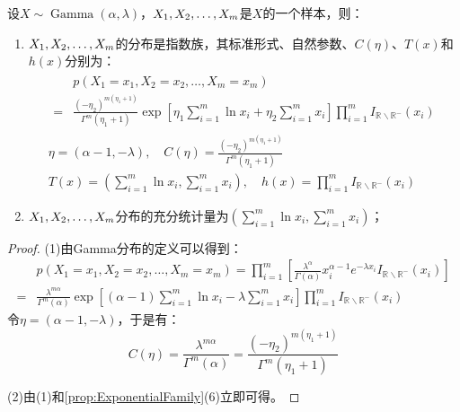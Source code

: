 \begin{theorem}
	设$X\sim\operatorname{Gamma}(\alpha,\lambda)$，$X_1, X_2, \dots, X_{m}$是$X$的一个样本，则：
	\begin{enumerate}
		\item $X_1, X_2, \dots, X_{m}$的分布是指数族，其标准形式、自然参数、$C(\eta)$、$T(x)$和$h(x)$分别为：
		\begin{gather*}
			\begin{aligned}
				&p(X_1=x_1,X_2=x_2,\dots,X_m=x_m) \\
				=&\frac{(-\eta_2)^{m(\eta_1+1)}}{\Gamma^m(\eta_1+1)}\exp\left[\eta_1\sum_{i=1}^{m}\ln x_i+\eta_2\sum_{i=1}^{m}x_i\right]\prod_{i=1}^{m}I_{\mathbb{R}^{}\backslash\mathbb{R}^{-}}(x_i)
			\end{aligned} \\
			\eta=(\alpha-1,-\lambda),\quad C(\eta)=\frac{(-\eta_2)^{m(\eta_1+1)}}{\Gamma^m(\eta_1+1)} \\
			T(x)=\left(\sum_{i=1}^{m}\ln x_i,\sum_{i=1}^{m}x_i\right),\quad h(x)=\prod_{i=1}^{m}I_{\mathbb{R}^{}\backslash\mathbb{R}^{-}}(x_i)
		\end{gather*}
		\item $X_1, X_2, \dots, X_{m}$分布的充分统计量为$\left(\sum\limits_{i=1}^{m}\ln x_i,\sum\limits_{i=1}^{m}x_i\right)$；
	\end{enumerate}
\end{theorem}
\begin{proof}
	(1)由Gamma分布的定义可以得到：
	\begin{align*}
		&p(X_1=x_1,X_2=x_2,\dots,X_m=x_m)=\prod_{i=1}^{m}\left[\frac{\lambda^{\alpha}}{\Gamma(\alpha)}x_i^{\alpha-1}e^{-\lambda x_i}I_{\mathbb{R}^{}\backslash\mathbb{R}^{-}}(x_i)\right] \\
		=&\frac{\lambda^{m\alpha}}{\Gamma^m(\alpha)}\exp\left[(\alpha-1)\sum_{i=1}^{m}\ln x_i-\lambda\sum_{i=1}^{m}x_i\right]\prod_{i=1}^{m}I_{\mathbb{R}^{}\backslash\mathbb{R}^{-}}(x_i)
	\end{align*}
	令$\eta=(\alpha-1,-\lambda)$，于是有：
	\begin{equation*}
		C(\eta)=\frac{\lambda^{m\alpha}}{\Gamma^m(\alpha)}=\frac{(-\eta_2)^{m(\eta_1+1)}}{\Gamma^m(\eta_1+1)}
	\end{equation*}\par
	(2)由(1)和\cref{prop:ExponentialFamily}(6)立即可得。
\end{proof}


